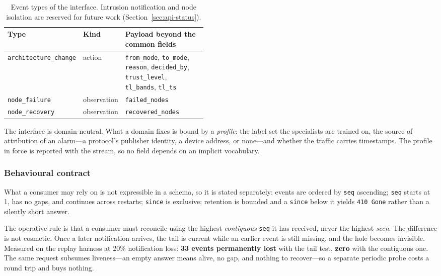 \begin{table}[htbp]
\centering
\caption{Event types of the interface. Intrusion notification and node isolation are
reserved for future work (Section~\ref{sec:api-status}).}
\label{tab:events}
\begin{tabular}{@{}llp{0.46\linewidth}@{}}
\toprule
Type & Kind & Payload beyond the common fields \\
\midrule
\texttt{architecture\_change} & action & \texttt{from\_mode}, \texttt{to\_mode}, \texttt{reason}, \texttt{decided\_by}, \texttt{trust\_level}, \texttt{tl\_bands}, \texttt{tl\_ts} \\
\texttt{node\_failure} & observation & \texttt{failed\_nodes} \\
\texttt{node\_recovery} & observation & \texttt{recovered\_nodes} \\
\bottomrule
\end{tabular}
\end{table}

The interface is domain-neutral. What a domain fixes is bound by a \emph{profile}: the label
set the specialists are trained on, the source of attribution of an alarm---a protocol's
publisher identity, a device address, or none---and whether the traffic carries
timestamps. The profile in force is reported with the stream, so no field depends on an
implicit vocabulary.

\subsubsection{Behavioural contract}

What a consumer may rely on is not expressible in a schema, so it is stated separately:
events are ordered by \texttt{seq} ascending; \texttt{seq} starts at 1, has no gaps, and
continues across restarts; \texttt{since} is exclusive; retention is bounded and a
\texttt{since} below it yields \texttt{410 Gone} rather than a silently short answer.

The operative rule is that a consumer must reconcile using the highest \emph{contiguous}
\texttt{seq} it has received, never the highest \emph{seen}. The difference is not
cosmetic. Once a later notification arrives, the tail is current while an earlier event is
still missing, and the hole becomes invisible. Measured on the replay harness at 20\%
notification loss: \textbf{33 events permanently lost} with the tail test, \textbf{zero}
with the contiguous one. The same request subsumes liveness---an empty answer means alive,
no gap, and nothing to recover---so a separate periodic probe costs a round trip and buys
nothing.

